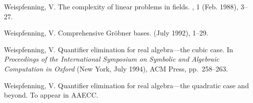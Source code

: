 \begin{thebibliography}{10}
{Weispfenning, V.}
\newblock The complexity of linear problems in fields.
, 1 (Feb. 1988), 3--27.

{Weispfenning, V.}
\newblock Comprehensive {G}r\"obner bases.
 (July 1992), 1--29.

{Weispfenning, V.}
\newblock Quantifier elimination for real algebra---the cubic case.
\newblock In {\em Proceedings of the International Symposium on Symbolic and
  Algebraic Computation in Oxford\/} (New York, July 1994), ACM Press,
  pp.~258--263.

{Weispfenning, V.}
\newblock Quantifier elimination for real algebra---the quadratic case and
  beyond.
\newblock To appear in AAECC.

\end{thebibliography}

